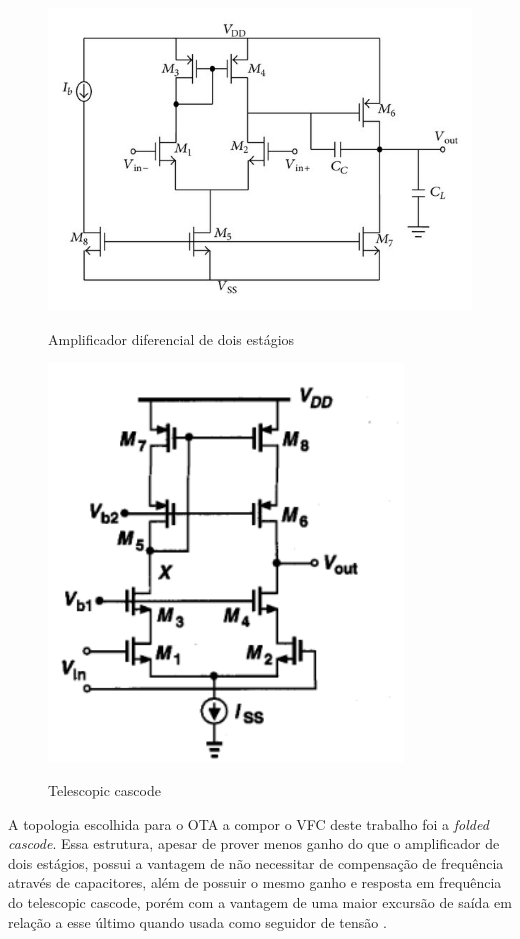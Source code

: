 \documentclass[
	12pt,				%
	oneside,			%
	a4paper,			%
	english,			%
	french,				%
	spanish,			%
	brazil				%
	]{abntex2}
\begin{document}
\begin{figure}[H]
\centering
\begin{minipage}{.5\textwidth}
  \centering
  \includegraphics[width=.8\linewidth]{twoStage.jpg}
  \caption{Amplificador diferencial de dois estágios}
  \label{twoStage}
\end{minipage}%
\begin{minipage}{.5\textwidth}
  \centering
  \includegraphics[width=.68\linewidth]{telescopic.PNG}
  \caption{Telescopic cascode}
  \label{telescopic}
\end{minipage}
\end{figure}

A topologia escolhida para o OTA a compor o VFC deste trabalho foi a \textit{folded cascode}. Essa estrutura, apesar de prover menos ganho do que o amplificador de dois estágios, possui a vantagem de não necessitar de compensação de frequência através de capacitores, além de possuir o mesmo ganho e resposta em frequência do telescopic cascode, porém com a vantagem de uma maior excursão de saída em relação a esse último quando usada como seguidor de tensão \cite{dehghani2013design}.
\end{document}
